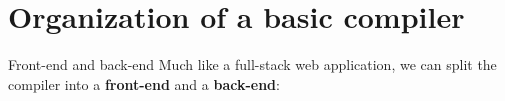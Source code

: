 \documentclass[../index.tex]{subfiles}
\begin{document}

\renewcommand{\sectiontitle}{Organization of a basic compiler}
\section{\sectiontitle}

\renewcommand{\currenttitle}{Front-end and back-end}
\begin{frame}{\currenttitle}
  Much like a full-stack web application, we can split the compiler into a
  \textbf{front-end} and a \textbf{back-end}:

\end{frame}

\end{document}
